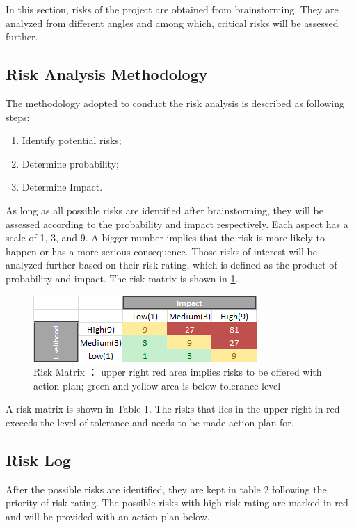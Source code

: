 

In this section, risks of the project are obtained from brainstorming. They are analyzed from different angles and among which, critical risks will be assessed further.   
\subsection{Risk Analysis Methodology}
The methodology adopted to conduct the risk analysis is described as following steps:  
\begin{enumerate}[itemsep=0pt, topsep=3pt, partopsep=3pt]
  \item Identify potential risks;
  \item Determine probability;
  \item Determine Impact.
\end{enumerate}

As long as all possible risks are identified after brainstorming, they will be assessed according to the probability and impact respectively. Each aspect has a scale of 1, 3, and 9. A bigger number implies that the risk is more likely to happen or has a more serious consequence. Those risks of interest will be analyzed further based on their risk rating, which is defined as the product of probability and impact. The risk matrix is shown in \ref{fig:riskmatrix}.  


\begin{figure}[h!]
\centering
\includegraphics[scale=1.0]{Pictures/riskmatrix.png}
\caption{Risk Matrix ： upper right red area implies risks to be offered with action plan; green and yellow area is below tolerance level }
\label{fig:riskmatrix}
\end{figure}

A risk matrix is shown in Table 1. The risks that lies in the upper right in red exceeds the level of tolerance and needs to be made action plan for. 
\subsection{Risk Log}
After the possible risks are identified, they are kept in table 2 following the priority of risk rating. The possible risks with high risk rating are marked in red and will be provided with an action plan below. 

